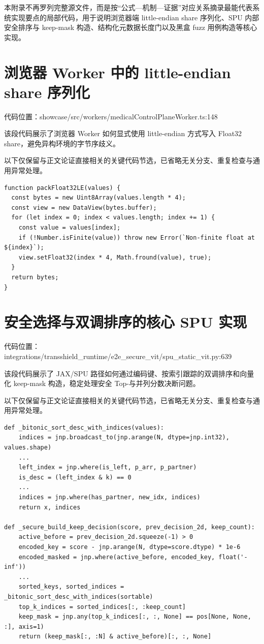 本附录不再罗列完整源文件，而是按“公式—机制—证据”对应关系摘录最能代表系统实现要点的局部代码，用于说明浏览器端 little-endian share 序列化、SPU 内部安全排序与 keep-mask 构造、结构化元数据长度门以及黑盒 fuzz 用例构造等核心实现。

\section{浏览器 Worker 中的 little-endian share 序列化}

代码位置：showcase/src/workers/medicalControlPlaneWorker.ts:148

该段代码展示了浏览器 Worker 如何显式使用 little-endian 方式写入 Float32 share，避免异构环境的字节序歧义。

以下仅保留与正文论证直接相关的关键代码节选，已省略无关分支、重复检查与通用异常处理。

\begin{lstlisting}
function packFloat32LE(values) {
  const bytes = new Uint8Array(values.length * 4);
  const view = new DataView(bytes.buffer);
  for (let index = 0; index < values.length; index += 1) {
    const value = values[index];
    if (!Number.isFinite(value)) throw new Error(`Non-finite float at ${index}`);
    view.setFloat32(index * 4, Math.fround(value), true);
  }
  return bytes;
}
\end{lstlisting}

\section{安全选择与双调排序的核心 SPU 实现}

代码位置：integrations/transshield\_runtime/e2e\_secure\_vit/spu\_static\_vit.py:639

该段代码展示了 JAX/SPU 路径如何通过编码键、按索引跟踪的双调排序和向量化 keep-mask 构造，稳定处理安全 Top-与并列分数决断问题。

以下仅保留与正文论证直接相关的关键代码节选，已省略无关分支、重复检查与通用异常处理。

\begin{lstlisting}
def _bitonic_sort_desc_with_indices(values):
    indices = jnp.broadcast_to(jnp.arange(N, dtype=jnp.int32), values.shape)
    ...
    left_index = jnp.where(is_left, p_arr, p_partner)
    is_desc = (left_index & k) == 0
    ...
    indices = jnp.where(has_partner, new_idx, indices)
    return x, indices

def _secure_build_keep_decision(score, prev_decision_2d, keep_count):
    active_before = prev_decision_2d.squeeze(-1) > 0
    encoded_key = score - jnp.arange(N, dtype=score.dtype) * 1e-6
    encoded_masked = jnp.where(active_before, encoded_key, float('-inf'))
    ...
    sorted_keys, sorted_indices = _bitonic_sort_desc_with_indices(sortable)
    top_k_indices = sorted_indices[:, :keep_count]
    keep_mask = jnp.any(top_k_indices[:, :, None] == pos[None, None, :], axis=1)
    return (keep_mask[:, :N] & active_before)[:, :, None]
\end{lstlisting}

